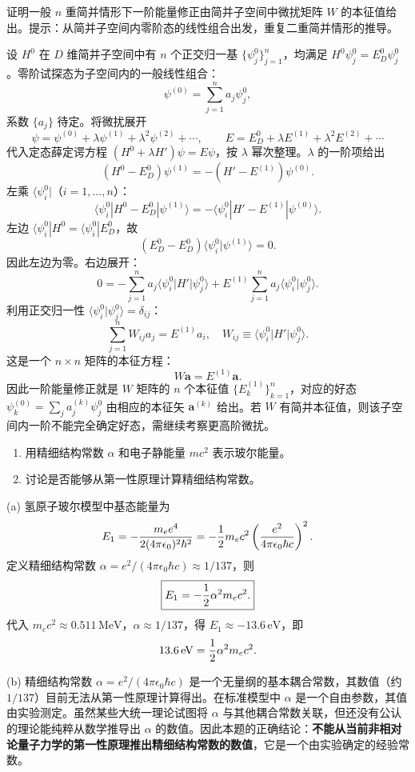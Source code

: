 \begin{question}
证明一般 $n$ 重简并情形下一阶能量修正由简并子空间中微扰矩阵 $W$ 的本征值给出。提示：从简并子空间内零阶态的线性组合出发，重复二重简并情形的推导。
\end{question}
\begin{solution}
设 $H^0$ 在 $D$ 维简并子空间中有 $n$ 个正交归一基 $\{\psi_j^0\}_{j=1}^n$，均满足 $H^0\psi_j^0=E_D^0\psi_j^0$。零阶试探态为子空间内的一般线性组合：
\[
\psi^{(0)}=\sum_{j=1}^n a_j\psi_j^0,
\]
系数 $\{a_j\}$ 待定。将微扰展开
\[
\psi=\psi^{(0)}+\lambda\psi^{(1)}+\lambda^2\psi^{(2)}+\cdots,\qquad
E=E_D^0+\lambda E^{(1)}+\lambda^2 E^{(2)}+\cdots
\]
代入定态薛定谔方程 $(H^0+\lambda H')\psi=E\psi$，按 $\lambda$ 幂次整理。$\lambda$ 的一阶项给出
\[
(H^0-E_D^0)\psi^{(1)}=-(H'-E^{(1)})\psi^{(0)}.
\]
左乘 $\langle\psi_i^0|$（$i=1,\dots,n$）：
\[
\langle\psi_i^0|H^0-E_D^0|\psi^{(1)}\rangle
=-\langle\psi_i^0|H'-E^{(1)}|\psi^{(0)}\rangle.
\]
左边 $\langle\psi_i^0|H^0=\langle\psi_i^0|E_D^0$，故
\[
(E_D^0-E_D^0)\langle\psi_i^0|\psi^{(1)}\rangle=0.
\]
因此左边为零。右边展开：
\[
0=-\sum_{j=1}^n a_j\langle\psi_i^0|H'|\psi_j^0\rangle
+E^{(1)}\sum_{j=1}^n a_j\langle\psi_i^0|\psi_j^0\rangle.
\]
利用正交归一性 $\langle\psi_i^0|\psi_j^0\rangle=\delta_{ij}$：
\[
\sum_{j=1}^n W_{ij}a_j = E^{(1)}a_i,\quad
W_{ij}\equiv\langle\psi_i^0|H'|\psi_j^0\rangle.
\]
这是一个 $n\times n$ 矩阵的本征方程：
\[
W\mathbf a = E^{(1)}\mathbf a.
\]
因此一阶能量修正就是 $W$ 矩阵的 $n$ 个本征值 $\{E_k^{(1)}\}_{k=1}^n$，对应的好态 $\psi_k^{(0)}=\sum_j a_j^{(k)}\psi_j^0$ 由相应的本征矢 $\mathbf a^{(k)}$ 给出。若 $W$ 有简并本征值，则该子空间内一阶不能完全确定好态，需继续考察更高阶微扰。
\end{solution}

\begin{question}
\begin{enumerate}
\item 用精细结构常数 $\alpha$ 和电子静能量 $mc^2$ 表示玻尔能量。
\item 讨论是否能够从第一性原理计算精细结构常数。
\end{enumerate}
\end{question}
\begin{solution}
(a) 氢原子玻尔模型中基态能量为
\[
E_1=-{m_ee^4\over2(4\pi\epsilon_0)^2\hbar^2}
=-{1\over2}m_ec^2\left({e^2\over4\pi\epsilon_0\hbar c}\right)^2.
\]
定义精细结构常数 $\alpha=e^2/(4\pi\epsilon_0\hbar c)\approx1/137$，则
\[
\boxed{E_1=-{1\over2}\alpha^2 m_ec^2.}
\]
代入 $m_ec^2\approx0.511\,\mathrm{MeV}$，$\alpha\approx1/137$，得 $E_1\approx-13.6\,\mathrm{eV}$，即
\[
13.6\,\mathrm{eV}={1\over2}\alpha^2m_ec^2.
\]

(b) 精细结构常数 $\alpha=e^2/(4\pi\epsilon_0\hbar c)$ 是一个无量纲的基本耦合常数，其数值（约 $1/137$）目前无法从第一性原理计算得出。在标准模型中 $\alpha$ 是一个自由参数，其值由实验测定。虽然某些大统一理论试图将 $\alpha$ 与其他耦合常数关联，但还没有公认的理论能纯粹从数学推导出 $\alpha$ 的数值。因此本题的正确结论：\textbf{不能从当前非相对论量子力学的第一性原理推出精细结构常数的数值}，它是一个由实验确定的经验常数。
\end{solution}

